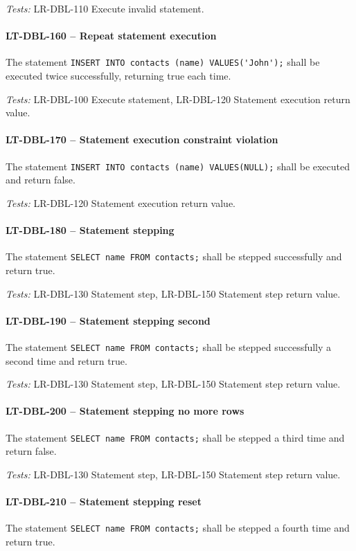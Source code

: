 \textit{Tests: } LR-DBL-110 Execute invalid statement.

\paragraph{LT-DBL-160 -- Repeat statement execution}
The statement \lstinline{INSERT INTO contacts (name) VALUES('John');}
shall be executed twice successfully, returning true each time.

\textit{Tests: } LR-DBL-100 Execute statement, LR-DBL-120 Statement execution
return value.

\paragraph{LT-DBL-170 -- Statement execution constraint violation}
The statement \lstinline{INSERT INTO contacts (name) VALUES(NULL);}
shall be executed and return false.

\textit{Tests: } LR-DBL-120 Statement execution return value.

\paragraph{LT-DBL-180 -- Statement stepping}
The statement \lstinline{SELECT name FROM contacts;} shall be
stepped successfully and return true.

\textit{Tests: } LR-DBL-130 Statement step, LR-DBL-150 Statement step return
value.

\paragraph{LT-DBL-190 -- Statement stepping second}
The statement \lstinline{SELECT name FROM contacts;} shall
be stepped successfully a second time and return true.

\textit{Tests: } LR-DBL-130 Statement step, LR-DBL-150 Statement step return
value.

\paragraph{LT-DBL-200 -- Statement stepping no more rows}
The statement \lstinline{SELECT name FROM contacts;} shall
be stepped a third time and return false.

\textit{Tests: } LR-DBL-130 Statement step, LR-DBL-150 Statement step return
value.

\paragraph{LT-DBL-210 -- Statement stepping reset}
The statement \lstinline{SELECT name FROM contacts;} shall
be stepped a fourth time and return true.

